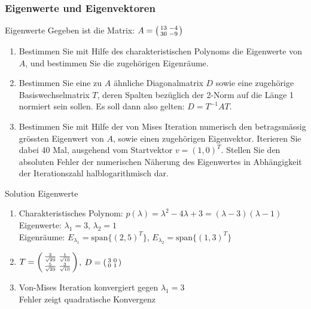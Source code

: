 \subsubsection{Eigenwerte und Eigenvektoren}

\begin{example2}{Eigenwerte}
Gegeben ist die Matrix:
$A = \begin{psmallmatrix}
13 & -4\\
30 & -9
\end{psmallmatrix}$
\begin{enumerate}
    \item Bestimmen Sie mit Hilfe des charakteristischen Polynoms die Eigenwerte von $A$, und bestimmen Sie die zugehörigen Eigenräume.
    
    \item Bestimmen Sie eine zu $A$ ähnliche Diagonalmatrix $D$ sowie eine zugehörige Basiswechselmatrix $T$, deren Spalten bezüglich der 2-Norm auf die Länge 1 normiert sein sollen. Es soll dann also gelten: $D = T^{-1}AT$.
    
    \item Bestimmen Sie mit Hilfe der von Mises Iteration numerisch den betragsmässig grössten Eigenwert von $A$, sowie einen zugehörigen Eigenvektor. Iterieren Sie dabei 40 Mal, ausgehend vom Startvektor $v = (1,0)^T$. Stellen Sie den absoluten Fehler der numerischen Näherung des Eigenwertes in Abhängigkeit der Iterationszahl halblogarithmisch dar.
\end{enumerate}
\end{example2}

\begin{KR}{Solution Eigenwerte}
\begin{enumerate}
    \item Charakteristisches Polynom:
    $p(\lambda) = \lambda^2 - 4\lambda + 3 = (\lambda-3)(\lambda-1)$\\
    Eigenwerte: $\lambda_1 = 3$, $\lambda_2 = 1$\\
    Eigenräume:
    $E_{\lambda_1} = \text{span}\{(2,5)^T\}$,
    $E_{\lambda_2} = \text{span}\{(1,3)^T\}$
    
    \item $T = \begin{psmallmatrix}
    \frac{2}{\sqrt{29}} & \frac{1}{\sqrt{10}}\\
    \frac{5}{\sqrt{29}} & \frac{3}{\sqrt{10}}
    \end{psmallmatrix}$,
    $D = \begin{psmallmatrix}
    3 & 0\\
    0 & 1
    \end{psmallmatrix}$
    
    \item Von-Mises Iteration konvergiert gegen $\lambda_1 = 3$\\
    Fehler zeigt quadratische Konvergenz
\end{enumerate}
\end{KR}



